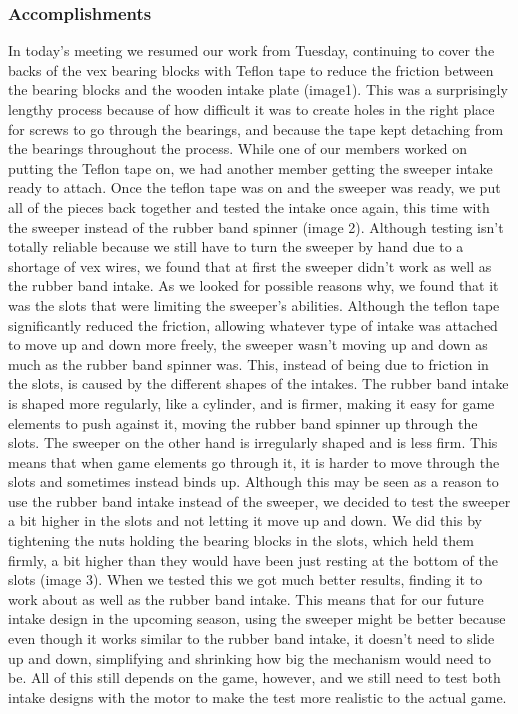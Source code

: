 \subsubsection*{Accomplishments}
In today’s meeting we resumed our work from Tuesday, continuing to cover the backs of the vex bearing blocks with Teflon tape to reduce the friction between the bearing blocks and the wooden intake plate (image1). This was a surprisingly lengthy process because of how difficult it was to create holes in the right place for screws to go through the bearings, and because the tape kept detaching from the bearings throughout the process.
While one of our members worked on putting the Teflon tape on, we had another member getting the sweeper intake ready to attach. Once the teflon tape was on and the sweeper was ready, we put all of the pieces back together and tested the intake once again, this time with the sweeper instead of the rubber band spinner (image 2). Although testing isn’t totally reliable because we still have to turn the sweeper by hand due to a shortage of vex wires, we found that at first the sweeper didn’t work as well as the rubber band intake. As we looked for possible reasons why, we found that it was the slots that were limiting the sweeper’s abilities. Although the teflon tape significantly reduced the friction, allowing whatever type of intake was attached to move up and down more freely, the sweeper wasn’t moving up and down as much as the rubber band spinner was. This, instead of being due to friction in the slots, is caused by the different shapes of the intakes. The rubber band intake is shaped more regularly, like a cylinder, and is firmer, making it easy for game elements to push against it, moving the rubber band spinner up through the slots. The sweeper on the other hand is irregularly shaped and is less firm. This means that when game elements go through it, it is harder to move through the slots and sometimes instead binds up.
Although this may be seen as a reason to use the rubber band intake instead of the sweeper, we decided to test the sweeper a bit higher in the slots and not letting it move up and down. We did this by tightening the nuts holding the bearing blocks in the slots, which held them firmly, a bit higher than they would have been just resting at the bottom of the slots (image 3). When we tested this we got much better results, finding it to work about as well as the rubber band intake. This means that for our future intake design in the upcoming season, using the sweeper might be better because even though it works similar to the rubber band intake, it doesn't need to slide up and down, simplifying and shrinking how big the mechanism would need to be. All of this still depends on the game, however, and we still need to test both intake designs with the motor to make the test more realistic to the actual game.



